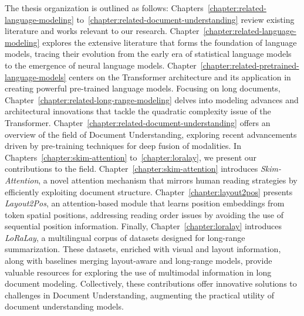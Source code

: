 
The thesis organization is outlined as follows: Chapters~\ref{chapter:related-language-modeling} to~\ref{chapter:related-document-understanding} review existing literature and works relevant to our research. Chapter~\ref{chapter:related-language-modeling} explores the extensive literature that forms the foundation of language models, tracing their evolution from the early era of statistical language models to the emergence of neural language models. Chapter~\ref{chapter:related-pretrained-language-models} centers on the Transformer architecture \citep{vaswani2017attention} and its application in creating powerful pre-trained language models. Focusing on long documents, Chapter~\ref{chapter:related-long-range-modeling} delves into modeling advances and architectural innovations that tackle the quadratic complexity issue of the Transformer. Chapter~\ref{chapter:related-document-understanding} offers an overview of the field of Document Understanding, exploring recent advancements driven by pre-training techniques for deep fusion of modalities. In Chapters~\ref{chapter:skim-attention} to~\ref{chapter:loralay}, we present our contributions to the field. Chapter~\ref{chapter:skim-attention} introduces \textit{Skim-Attention}, a novel attention mechanism that mirrors human reading strategies by efficiently exploiting document structure. Chapter~\ref{chapter:layout2pos} presents \textit{Layout2Pos}, an attention-based module that learns position embeddings from token spatial positions, addressing reading order issues by avoiding the use of sequential position information. Finally, Chapter~\ref{chapter:loralay} introduces \textit{LoRaLay}, a multilingual corpus of datasets designed for long-range summarization. These datasets, enriched with visual and layout information, along with baselines merging layout-aware and long-range models, provide valuable resources for exploring the use of multimodal information in long document modeling. Collectively, these contributions offer innovative solutions to challenges in Document Understanding, augmenting the practical utility of document understanding models.



